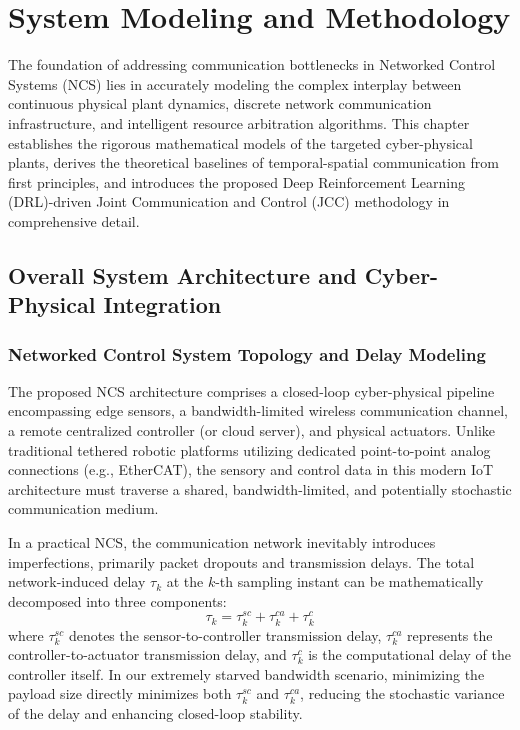 \section{System Modeling and Methodology}

The foundation of addressing communication bottlenecks in Networked Control Systems (NCS) lies in accurately modeling the complex interplay between continuous physical plant dynamics, discrete network communication infrastructure, and intelligent resource arbitration algorithms. This chapter establishes the rigorous mathematical models of the targeted cyber-physical plants, derives the theoretical baselines of temporal-spatial communication from first principles, and introduces the proposed Deep Reinforcement Learning (DRL)-driven Joint Communication and Control (JCC) methodology in comprehensive detail.

\subsection{Overall System Architecture and Cyber-Physical Integration}

\subsubsection{Networked Control System Topology and Delay Modeling}
The proposed NCS architecture comprises a closed-loop cyber-physical pipeline encompassing edge sensors, a bandwidth-limited wireless communication channel, a remote centralized controller (or cloud server), and physical actuators. Unlike traditional tethered robotic platforms utilizing dedicated point-to-point analog connections (e.g., EtherCAT), the sensory and control data in this modern IoT architecture must traverse a shared, bandwidth-limited, and potentially stochastic communication medium.

In a practical NCS, the communication network inevitably introduces imperfections, primarily packet dropouts and transmission delays. The total network-induced delay $\tau_k$ at the $k$-th sampling instant can be mathematically decomposed into three components:
\begin{equation}
    \tau_k = \tau_k^{sc} + \tau_k^{ca} + \tau_k^{c}
\end{equation}
where $\tau_k^{sc}$ denotes the sensor-to-controller transmission delay, $\tau_k^{ca}$ represents the controller-to-actuator transmission delay, and $\tau_k^{c}$ is the computational delay of the controller itself. In our extremely starved bandwidth scenario, minimizing the payload size directly minimizes both $\tau_k^{sc}$ and $\tau_k^{ca}$, reducing the stochastic variance of the delay and enhancing closed-loop stability.

